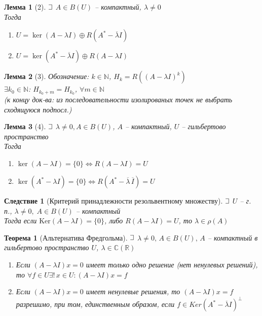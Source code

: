 \documentclass{article}
\theoremstyle{truestyle}
\newtheorem*{theorem}{Теорема}
\newtheorem*{lemma}{Лемма}
\newtheorem*{sled}{Следствие}
\newcommand{\Ker}{\text{Ker}}
\def\letus{%
	\mathord{\setbox0=\hbox{$\exists$}%
		\hbox{\kern 0.125\wd0%
			\vbox to \ht0{%
				\hrule width 0.75\wd0%
				\vfill%
				\hrule width 0.75\wd0}%
			\vrule height \ht0%
			\kern 0.125\wd0}%
	}%
}
\begin{document}
\begin{lemma}[2]
  $\letus$ $A \in B(U)$ -- компактный, $\lambda \not = 0$\\
  Тогда\begin{minipage}[t]{0.8\linewidth}\begin{enumerate}[itemsep=1mm]
      \item $U = \ker(A -\lambda I) \oplus R(A^* - \overline{\lambda} I)$
      \item $U = \ker(A^* -\overline{\lambda}I) \oplus R(A - \lambda I)$
    \end{enumerate}\end{minipage}
\end{lemma}


\begin{lemma}[3]
  \noindent Обозначение: $k \in \mathbb{N}$, $H_k = R((A - \lambda I)^k)$ \\
  $\exists k_0 \in \mathbb{N}$: 
  $H_{k_0 + m} = H_{k_0}$, $\forall m \in \mathbb{N}$ \\
  (к концу док-ва: из последовательности изолированых точек не выбрать сходящуюся подпосл.)
\end{lemma}


\begin{lemma}[4]
  $\letus$ $\lambda \not = 0, A \in B(U)$, $A$ -- компактный, $U$ -- гильбертово пространство\\
  Тогда\begin{minipage}[t]{0.8\linewidth}\begin{enumerate}[itemsep=1mm]
      \item $\ker(A -\lambda I) = \{0\} \Leftrightarrow R(A - \lambda I) = U$
      \item $\ker(A^* -\lambda I) = \{0\} \Leftrightarrow R(A^* - \overline{\lambda}\,\overline{I}) = U$
      \end{enumerate}\end{minipage}
\end{lemma}

\begin{sled}[Критерий принадлежности резольвентному множеству]
  $\letus$ $U$ -- г. п.,  $\lambda \ne  0, \; A \in B(U)$ -- компактный\\
  Тогда если $\Ker(A -\lambda I) = \{0\}$, либо $R(A - \lambda I) = U$, то $\lambda \in \rho(A)$
\end{sled}

\begin{theorem}[Альтернатива Фредгольма]
  $\letus$ $\lambda \ne 0, \, A \in B(U), \, A$ -- компактный в гильбертово пространство $U$, $\lambda \in \mathbb{C}(\mathbb{R})$
  \begin{enumerate}
    \item Если $(A - \lambda I)x = 0$ имеет только одно решение (нет ненулевых решений), то 
    $\forall f \in U \exists! \, x \in U: (A - \lambda I)x = f$
    \item Если $(A - \lambda I)x = 0$ имеет ненулевые решения, то $(A - \lambda I)x = f$ разрешимо, при том, единственным образом, 
    если $f\in Ker(A^* - \overline{\lambda}I)^\perp$
  \end{enumerate}
\end{theorem}
\end{document}
